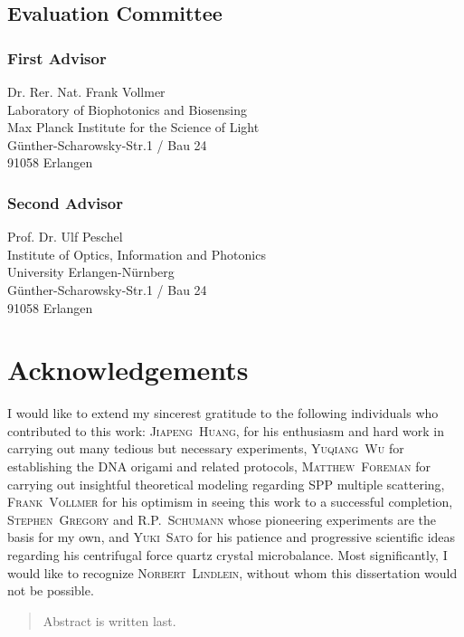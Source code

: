 \documentclass[a4paper,titlepage,onecolumn]{report}
\newcommand{\name}[1]{\textsc{#1}}
\begin{document}
\section*{Evaluation Committee}
\subsection*{First Advisor}
Dr. Rer. Nat. Frank Vollmer\\
Laboratory of Biophotonics and Biosensing\\
Max Planck Institute for the Science of Light\\
G\"unther-Scharowsky-Str.1 / Bau 24\\
91058 Erlangen
\subsection*{Second Advisor}
Prof. Dr. Ulf Peschel\\
Institute of Optics, Information and Photonics\\
University Erlangen-N\"urnberg\\
G\"unther-Scharowsky-Str.1 / Bau 24\\
91058 Erlangen

\newpage
\chapter*{Acknowledgements}
I would like to extend my sincerest gratitude to the following individuals
who contributed to this work: \name{Jiapeng~Huang}, for his enthusiasm
and hard work in carrying out many tedious but necessary experiments,
\name{Yuqiang~Wu} for establishing the DNA origami and related protocols,
\name{Matthew~Foreman} for carrying out insightful theoretical modeling
regarding SPP multiple scattering, \name{Frank~Vollmer} for his optimism
in seeing this work to a successful completion, \name{Stephen~Gregory}
and \name{R\@.P.\@~Schumann} whose pioneering experiments are the basis
for my own, and \name{Yuki~Sato} for his patience and progressive
scientific ideas regarding his centrifugal force quartz crystal
microbalance.  Most significantly, I would like to recognize
\name{Norbert~Lindlein}, without whom this dissertation would not be
possible.

\tableofcontents

\begin{abstract}
 Abstract is written last.
\end{abstract}
\end{document}
